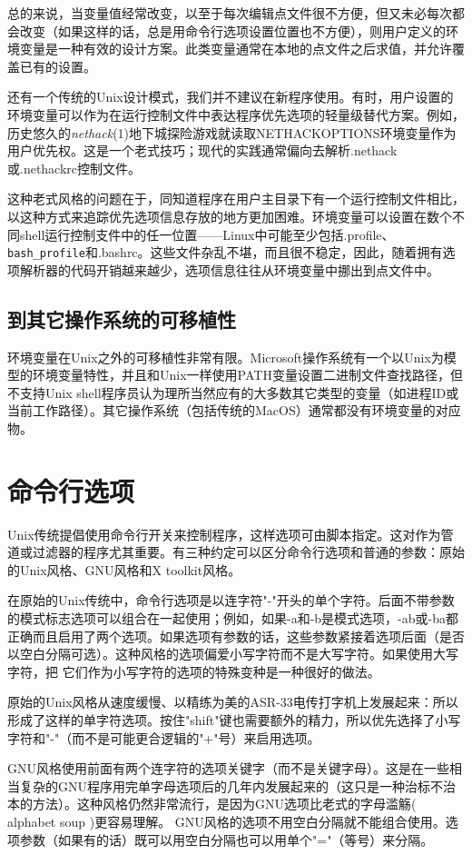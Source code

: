 \documentclass[12pt,oneside]{book}
\begin{document}
\begin{common-format}
总的来说，当变量值经常改变，以至于每次编辑点文件很不方便，但又未必每次都会改变（如果这样的话，总是用命令行选项设置位置也不方便），则用户定义的环境变量是一种有效的设计方案。此类变量通常在本地的点文件之后求值，并允许覆盖已有的设置。

还有一个传统的Unix设计模式，我们并不建议在新程序使用。有时，用户设置的环境变量可以作为在运行控制文件中表达程序优先选项的轻量级替代方案。例如，历史悠久的\textit{nethack}(1)地下城探险游戏就读取NETHACKOPTIONS环境变量作为用户优先权。这是一个老式技巧；现代的实践通常偏向去解析.nethack或.nethackrc控制文件。

这种老式风格的问题在于，同知道程序在用户主目录下有一个运行控制文件相比，以这种方式来追踪优先选项信息存放的地方更加困难。环境变量可以设置在数个不同shell运行控制支件中的任一位置——Linux中可能至少包括.profile、\verb+bash_profile+和.bashrc。这些文件杂乱不堪，而且很不稳定，因此，随着拥有选项解析器的代码开销越来越少，选项信息往往从环境变量中挪出到点文件中。

\subsection{到其它操作系统的可移植性}
环境变量在Unix之外的可移植性非常有限。Microsoft操作系统有一个以Unix为模型的环境变量特性，并且和Unix一样使用PATH变量设置二进制文件查找路径，但不支持Unix shell程序员认为理所当然应有的大多数其它类型的变量（如进程ID或当前工作路径）。其它操作系统（包括传统的MacOS）通常都没有环境变量的对应物。

\section{命令行选项}
Unix传统提倡使用命令行开关来控制程序，这样选项可由脚本指定。这对作为管道或过滤器的程序尤其重要。有三种约定可以区分命令行选项和普通的参数：原始的Unix风格、GNU风格和X toolkit风格。

在原始的Unix传统中，命令行选项是以连字符"-"开头的单个字符。后面不带参数的模式标志选项可以组合在一起使用；例如，如果-a和-b是模式选项，-ab或-ba都正确而且启用了两个选项。如果选项有参数的话，这些参数紧接着选项后面（是否以空白分隔可选）。这种风格的选项偏爱小写字符而不是大写字符。如果使用大写字符，把
它们作为小写字符的选项的特殊变种是一种很好的做法。

原始的Unix风格从速度缓慢、以精练为美的ASR-33电传打字机上发展起来：所以形成了这样的单字符选项。按住"shift"键也需要额外的精力，所以优先选择了小写字符和"-"（而不是可能更合逻辑的"+"号）来启用选项。

GNU风格使用前面有两个连字符的选项关键字（而不是关键字母）。这是在一些相当复杂的GNU程序用完单字母选项后的几年内发展起来的（这只是一种治标不治本的方法）。这种风格仍然非常流行，是因为GNU选项比老式的字母滥觞( alphabet soup )更容易理解。 GNU风格的选项不用空白分隔就不能组合使用。选项参数（如果有的话）既可以用空白分隔也可以用单个"="（等号）来分隔。


\end{common-format}
\end{document}
